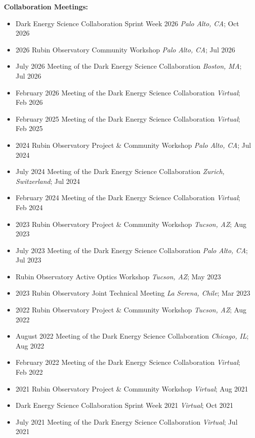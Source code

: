 \textbf{Collaboration Meetings:}
\begin{itemize}
    \item Dark Energy Science Collaboration Sprint Week 2026 \hfill \textit{Palo Alto, CA}; Oct 2026
    \item 2026 Rubin Observatory Community Workshop \hfill \textit{Palo Alto, CA}; Jul 2026
    \item July 2026 Meeting of the Dark Energy Science Collaboration \hfill \textit{Boston, MA}; Jul 2026
    \item February 2026 Meeting of the Dark Energy Science Collaboration \hfill \textit{Virtual}; Feb 2026
    \item February 2025 Meeting of the Dark Energy Science Collaboration \hfill \textit{Virtual}; Feb 2025
    \item 2024 Rubin Observatory Project \& Community Workshop \hfill \textit{Palo Alto, CA}; Jul 2024
    \item July 2024 Meeting of the Dark Energy Science Collaboration \hfill \textit{Zurich, Switzerland}; Jul 2024
    \item February 2024 Meeting of the Dark Energy Science Collaboration \hfill \textit{Virtual}; Feb 2024
    \item 2023 Rubin Observatory Project \& Community Workshop \hfill \textit{Tucson, AZ}; Aug 2023
    \item July 2023 Meeting of the Dark Energy Science Collaboration \hfill \textit{Palo Alto, CA}; Jul 2023
    \item Rubin Observatory Active Optics Workshop \hfill \textit{Tucson, AZ}; May 2023
    \item 2023 Rubin Observatory Joint Technical Meeting \hfill \textit{La Serena, Chile}; Mar 2023
    \item 2022 Rubin Observatory Project \& Community Workshop \hfill \textit{Tucson, AZ}; Aug 2022
    \item August 2022 Meeting of the Dark Energy Science Collaboration \hfill \textit{Chicago, IL}; Aug 2022
    \item February 2022 Meeting of the Dark Energy Science Collaboration \hfill \textit{Virtual}; Feb 2022
    \item 2021 Rubin Observatory Project \& Community Workshop \hfill \textit{Virtual}; Aug 2021
    \item Dark Energy Science Collaboration Sprint Week 2021 \hfill \textit{Virtual}; Oct 2021
    \item July 2021 Meeting of the Dark Energy Science Collaboration \hfill \textit{Virtual}; Jul 2021

\end{itemize}
